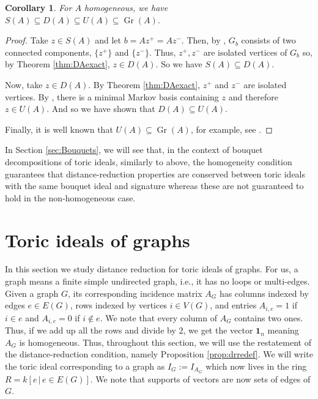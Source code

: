 \documentclass[a4paper, 12pt]{article}
\theoremstyle{plain}
\newtheorem{corollary}[theorem]{Corollary}
\theoremstyle{definition}
\theoremstyle{remark}
\begin{document}
\begin{corollary}
    For $A$ homogeneous, we have
    $S(A) \subseteq D(A) \subseteq U(A) \subseteq \operatorname{Gr}(A)$.
\end{corollary}

\begin{proof}
    Take $z \in S(A)$ and let $b = Az^+=Az^-$. Then, by \cite[Corollary 2.10]{CKT_2007}, $G_b$ consists of two connected components, $\{z^+\}$ and $\{z^-\}$. Thus, $z^+,z^-$ are isolated vertices of $G_b$ so, by Theorem \ref{thm:DAexact}, $z \in D(A)$. So we have $S(A) \subseteq D(A)$.

    Now, take $z \in D(A)$. By Theorem \ref{thm:DAexact}, $z^+$ and $z^-$ are isolated vertices. By \cite[Theorem~2.6]{CKT_2007}, there is a minimal Markov basis containing $z$ and therefore $z \in U(A)$. And so we have shown that $D(A) \subseteq U(A)$.

    Finally, it is well known that $U(A) \subseteq \operatorname{Gr}(A)$, for example, see \cite{sturmfels1996grobner}.
\end{proof}

In Section \ref{sec:Bouquets}, we will see that, in the context of bouquet decompositions of toric ideals, similarly to above, the homogeneity condition guarantees that distance-reduction properties are conserved between toric ideals with the same bouquet ideal and signature whereas these are not guaranteed to hold in the non-homogeneous case.


\section{Toric ideals of graphs}\label{sec: graphs}


In this section we study distance reduction for toric ideals of graphs. For us, a graph means a finite simple undirected graph, i.e., it has no loops or multi-edges. Given a graph $G$, its corresponding incidence matrix $A_G$ has columns indexed by edges $e \in E(G)$, rows indexed by vertices $i \in V(G)$, and entries $A_{i,e} = 1$ if $i \in e$ and $A_{i,e} = 0$ if $i \notin e$. We note that every column of $A_G$ contains two ones. Thus, if we add up all the rows and divide by 2, we get the vector $\mathbf{1}_n$ meaning $A_G$ is homogeneous. Thus, throughout this section, we will use the restatement of the distance-reduction condition, namely Proposition \ref{prop:drredef}. We will write the toric ideal corresponding to a graph as $I_G:=I_{A_G}$ which now lives in the ring $R=k[e\,|\,e \in E(G)]$. We note that supports of vectors are now sets of edges of $G$.
\end{document}
